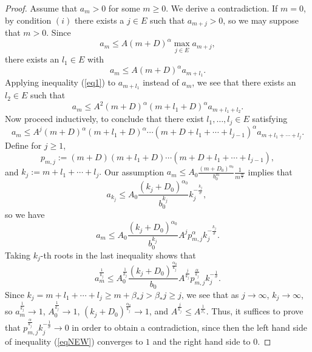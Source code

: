 \documentclass[10pt,a4paper]{amsart}
\begin{document}
\begin{proof}
	Assume that $a_{m} > 0$ for some $m \ge 0$. We derive a contradiction. If $m =0$, by condition $(i)$ there exists a $j \in E$ such that $a_{m + j} > 0$, so we may suppose that $m > 0$. Since
	\begin{equation}
		a_{m}\leq A\left(  m+D\right)  ^{\alpha}\max_{j\in E}a_{m+j},\label{eq1}%
	\end{equation}
	there exists an $l_{1}\in E$ with
	\[
	a_{m}\leq A\left(  m+D\right)  ^{\alpha}a_{m+l_{1}}.
	\]
	Applying inequality (\ref{eq1}) to $a_{m+l_{1}}$ instead of $a_{m}$, we
	see that there exists an $l_{2}\in E$ such that
	\[
	a_{m}\leq A^{2}\left(  m+D\right)  ^{\alpha}\left(  m+l_{1}+D\right)
	^{\alpha}a_{m+l_{1}+l_{2}}.
	\]
	Now proceed inductively, to conclude that there exist $l_{1}, \dots,l_{j}\in E$
	satisfying
	\[
	a_{m}\leq A^{j}\left(  m+D\right)  ^{\alpha}\left(  m+l_{1}+D\right)
	^{\alpha}\cdots\left(  m+D+l_{1}+\cdots+l_{j-1}\right)  ^{\alpha}%
	a_{m+l_{1}+\cdots+l_{j}}.
	\]
	Define for $j \ge 1$, 
	\[
	p_{m,j} :=\left(  m+D\right)  \left(  m+l_{1}+D\right)  \cdots\left(
	m+D+l_{1}+\cdots+l_{j-1}\right),
	\]
	and $k_{j}:=
	m+l_{1}+\cdots+l_{j}.$ Our assumption $a_{m}\leq A_{0}\frac{\left(
		m+D_{0}\right)  ^{\alpha_{0}}}{b_{0}^{m}}\frac{1}{m^{\frac{m}{\sigma}}}$
	implies that
	\[
	a_{k_{j}}\leq A_{0}\frac{\left(  k_{j}+D_{0}\right)  ^{\alpha_{0}}}%
	{b_{0}^{k_{j}}}k_{j}^{-\frac{k_{j}}{\sigma}}, \
	\]
	so we have
	\[
	a_{m}\leq A_{0}\frac{\left(  k_{j}+D_{0}\right)  ^{\alpha_{0}}}{b_{0}^{k_{j}}%
	}A^{j}p_{m,j}^{\alpha}k_{j}^{-\frac{k_{j}}{\sigma}}.
	\]
	Taking $k_{j}$-th roots in the last inequality shows that
	\begin{equation}
		a_{m}^{\frac{1}{k_{j}}}\leq A_{0}^{\frac{1}{k_{j}}}\frac{\left(  k_{j}%
			+D_{0}\right)  ^{\frac{\alpha_{0}}{k_{j}}}}{b_{0}}A^{\frac{j}{k_{j}}}%
		p_{m,j}^{\frac{\alpha}{k_{j}}}k_{j}^{-\frac{1}{\sigma}}.\label{eqNEW}%
	\end{equation}
	Since $k_{j}=m+l_{1}+\cdots+l_{j}\geq m+\beta_{\ast}j > \beta_{\ast}j \ge j$,   we see
	that as $j \to \infty$, $k_{j}\rightarrow\infty$, so
	$a_{m}^{\frac{1}{k_{j}}}\rightarrow 1$,  $A_{0}
	^{\frac{1}{k_{j}}}\rightarrow 1$, $\left(  k_{j}+D_{0}\right)
	^{\frac{\alpha_{0}}{k_{j}}}\rightarrow1$, and $A^{\frac{j}{k_{j}}} \le
	A^{\frac{1}{\beta_{\ast}}}$. Thus, it suffices  to prove
	that $p_{m,j}^{\frac{\alpha}{k_{j}}}k_{j}^{-\frac{1}{\sigma}}\rightarrow0$ in order to
	obtain a contradiction, since then the left hand side of inequality (\ref{eqNEW}) converges to
	$1$ and the right hand side to $0.$ 
	

\end{proof}
\end{document}
